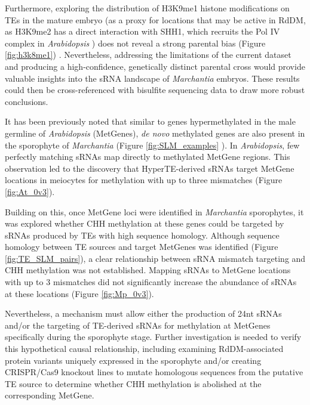  Furthermore, exploring the distribution of H3K9me1 histone modifications on TEs in the mature embryo (as a proxy for locations that may be active in RdDM, as H3K9me2 has a direct interaction with SHH1, which recruits the Pol IV complex in \textit{Arabidopsis} \cite{RN116}) does not reveal a strong parental bias (Figure \ref{fig:h3k8me1}) \cite{RN160}. Nevertheless, addressing the limitations of the current dataset and producing a high-confidence, genetically distinct parental cross would provide valuable insights into the sRNA landscape of \textit{Marchantia} embryos. These results could then be cross-referenced with bisulfite sequencing data to draw more robust conclusions.

It has been previously noted that similar to genes hypermethylated in the male germline of \textit{Arabidopsis} (MetGenes), \textit{de novo} methylated genes are also present in the sporophyte of \textit{Marchantia} (Figure \ref{fig:SLM_examples} \cite{jimmythesis}). In \textit{Arabidopsis}, few perfectly matching sRNAs map directly to methylated MetGene regions. This observation led to the discovery that HyperTE-derived sRNAs target MetGene locations in meiocytes for methylation with up to three mismatches \cite{RN187} (Figure \ref{fig:At_0v3}). 

Building on this, once MetGene loci were identified in \textit{Marchantia} sporophytes, it was explored whether CHH methylation  at these genes could be targeted by sRNAs produced by TEs with high sequence homology. Although sequence homology between TE sources and target MetGenes was identified (Figure \ref{fig:TE_SLM_pairs}), a clear relationship between sRNA mismatch targeting and CHH methylation was not established. Mapping sRNAs to MetGene locations with up to 3 mismatches did not significantly increase the abundance of sRNAs at these locations (Figure \ref{fig:Mp_0v3}). 

Nevertheless, a mechanism must allow either the production of 24nt sRNAs and/or the targeting of TE-derived sRNAs for methylation at MetGenes specifically during the sporophyte stage. Further investigation is needed to verify this hypothetical causal relationship, including examining RdDM-associated protein variants uniquely expressed in the sporophyte and/or creating CRISPR/Cas9 knockout lines to mutate homologous sequences from the putative TE source to determine whether CHH methylation is abolished at the corresponding MetGene.

